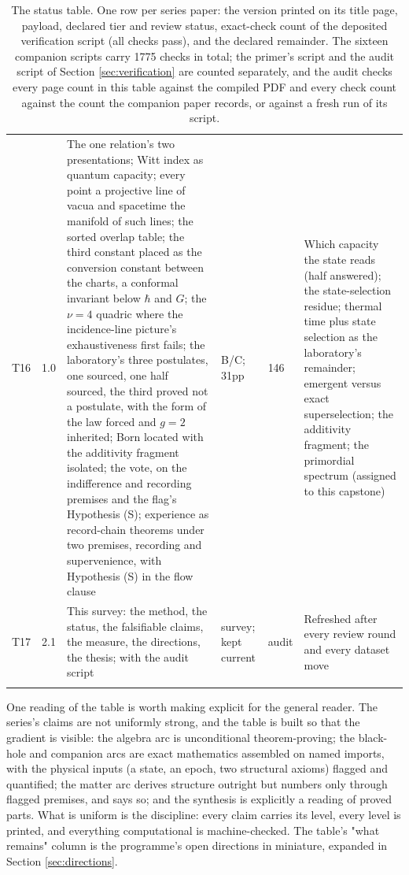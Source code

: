 \documentclass[11pt]{article}
\theoremstyle{definition}
\begin{document}
\begin{longtable}{p{} p{} p{} p{} p{} p{}}
T16 & 1.0 & The one relation's two presentations; Witt index as quantum capacity; every point a projective line of vacua and spacetime the manifold of such lines; the sorted overlap table; the third constant placed as the conversion constant between the charts, a conformal invariant below $\hbar$ and $G$; the $\nu = 4$ quadric where the incidence-line picture's exhaustiveness first fails; the laboratory's three postulates, one sourced, one half sourced, the third proved not a postulate, with the form of the law forced and $g = 2$ inherited; Born located with the additivity fragment isolated; the vote, on the indifference and recording premises and the flag's Hypothesis (S); experience as record-chain theorems under two premises, recording and supervenience, with Hypothesis (S) in the flow clause \cite{ButlerT16} & B/C; 31pp & 146 & Which capacity the state reads (half answered); the state-selection residue; thermal time plus state selection as the laboratory's remainder; emergent versus exact superselection; the additivity fragment; the primordial spectrum (assigned to this capstone) \\
T17 & 2.1 & This survey: the method, the status, the falsifiable claims, the measure, the directions, the thesis; with the audit script & survey; kept current & audit & Refreshed after every review round and every dataset move \\
\bottomrule
\caption{The status table. One row per series paper: the version printed on its title page, payload, declared tier and review status, exact-check count of the deposited verification script (all checks pass), and the declared remainder. The sixteen companion scripts carry 1775 checks in total; the primer's script and the audit script of Section \ref{sec:verification} are counted separately, and the audit checks every page count in this table against the compiled PDF and every check count against the count the companion paper records, or against a fresh run of its script.}
\label{tab:status}
\end{longtable}
\endgroup

One reading of the table is worth making explicit for the general reader. The series's claims are not uniformly strong, and the table is built so that the gradient is visible: the algebra arc is unconditional theorem-proving; the black-hole and companion arcs are exact mathematics assembled on named imports, with the physical inputs (a state, an epoch, two structural axioms) flagged and quantified; the matter arc derives structure outright but numbers only through flagged premises, and says so; and the synthesis is explicitly a reading of proved parts. What is uniform is the discipline: every claim carries its level, every level is printed, and everything computational is machine-checked. The table's "what remains" column is the programme's open directions in miniature, expanded in Section \ref{sec:directions}.
\end{document}
